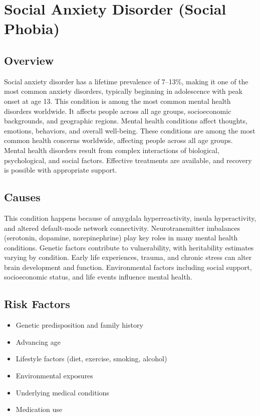 \chapter{Social Anxiety Disorder (Social Phobia)}
\label{sec:Social Anxiety Disorder (Social Phobia)}

\section{Overview}
Social anxiety disorder has a lifetime prevalence of 7--13\%, making it one of the most common anxiety disorders, typically beginning in adolescence with peak onset at age 13. This condition is among the most common mental health disorders worldwide. It affects people across all age groups, socioeconomic backgrounds, and geographic regions. Mental health conditions affect thoughts, emotions, behaviors, and overall well-being. These conditions are among the most common health concerns worldwide, affecting people across all age groups. Mental health disorders result from complex interactions of biological, psychological, and social factors. Effective treatments are available, and recovery is possible with appropriate support.
\section{Causes}
This condition happens because of amygdala hyperreactivity, insula hyperactivity, and altered default-mode network connectivity.  Neurotransmitter imbalances (serotonin, dopamine, norepinephrine) play key roles in many mental health conditions. Genetic factors contribute to vulnerability, with heritability estimates varying by condition. Early life experiences, trauma, and chronic stress can alter brain development and function. Environmental factors including social support, socioeconomic status, and life events influence mental health.   
\section{Risk Factors}
\begin{itemize}[noitemsep]
  \item Genetic predisposition and family history
  \item Advancing age
  \item Lifestyle factors (diet, exercise, smoking, alcohol)
  \item Environmental exposures
  \item Underlying medical conditions
  \item Medication use
\end{itemize}
